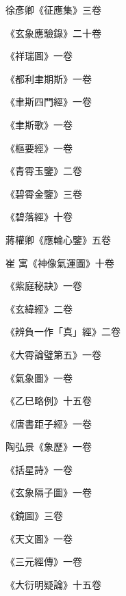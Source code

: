 \begin{pinyinscope}
 徐彥卿《征應集》三卷



 《玄象應驗錄》二十卷



 《祥瑞圖》一卷



 《都利聿期斯》一卷



 《聿斯四門經》一卷



 《聿斯歌》一卷



 《樞要經》一卷



 《青霄玉鑒》二卷



 《碧霄金鑒》三卷



 《碧落經》十卷



 蔣權卿《應輪心鑒》五卷



 崔
 寓《神像氣運圖》十卷



 《紫庭秘訣》一卷



 《玄緯經》二卷



 《辨負一作「真」經》二卷



 《大霄論璧第五》一卷



 《氣象圖》一卷



 《乙巳略例》十五卷



 《唐書距子經》一卷



 陶弘景《象歷》一卷



 《括星詩》一卷



 《玄象隔子圖》一卷



 《鏡圖》三卷



 《天文圖》一卷



 《三元經傳》一卷



 《大衍明疑論》十五卷




\end{pinyinscope}
